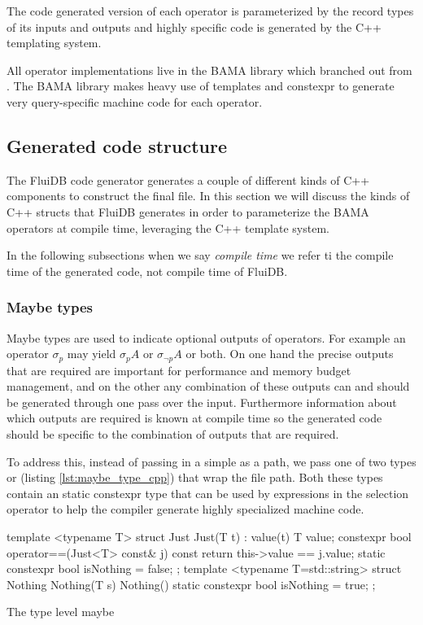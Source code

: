 The code generated version of each operator is parameterized by the
record types of its inputs and outputs and highly specific code is
generated by the C++ templating system.

All operator implementations live in the BAMA library which branched
out from \cite{krikellasGeneratingCodeHolistic2010}. The BAMA library
makes heavy use of templates and constexpr to generate very
query-specific machine code for each operator.

\subsection{Generated code structure}

The FluiDB code generator generates a couple of different kinds of C++
components to construct the final file. In this section we will
discuss the kinds of C++ structs that FluiDB generates in order to
parameterize the BAMA operators at compile time, leveraging the C++
template system.

In the following subsections when we say \emph{compile time} we refer ti
the compile time of the generated code, not compile time of FluiDB.

\subsubsection{Maybe types}

Maybe types are used to indicate optional outputs of operators. For
example an operator \(\sigma_p\) may yield \(\sigma_p A\) or
\(\sigma_{\neg p} A\) or both. On one hand the precise outputs that
are required are important for performance and memory budget
management, and on the other any combination of these outputs can and
should be generated through one pass over the input. Furthermore
information about which outputs are required is known at compile time
so the generated code should be specific to the combination of outputs
that are required.

To address this, instead of passing in a simple  as a
path, we pass one of two types  or  (listing
\ref{lst:maybe_type_cpp}) that wrap the file path. Both these types
contain an  static constexpr type that can be used by
 expressions in the selection operator to help
the compiler generate highly specialized machine code.

\begin{code}
\begin{cppcode}
template <typename T>
struct Just {
  Just(T t) : value(t) {}
  T value;
  constexpr bool operator==(Just<T> const& j) const {
    return this->value == j.value;
  }
  static constexpr bool isNothing = false;
};
template <typename T=std::string>
struct Nothing {
  Nothing(T s) {}
  Nothing() {}
  static constexpr bool isNothing = true;
};
\end{cppcode}
\caption{\label{lst:maybe_type_cpp}The type level maybe}
\end{code}

